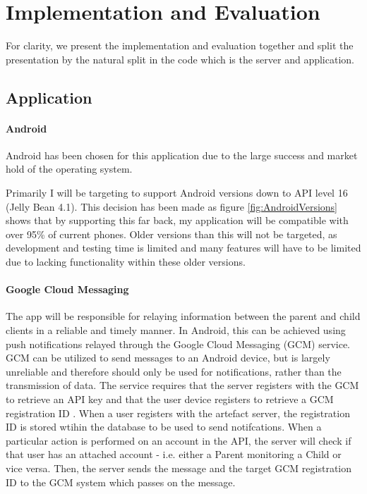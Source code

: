 \chapter{Implementation and Evaluation}

For clarity, we present the implementation and evaluation together and split the presentation by the natural split in the code which is the server and application.

\section{Application}
\subsubsection{Android}
Android has been chosen for this application due to the large success and market hold of the operating system.


Primarily I will be targeting to support Android versions down to API level 16 (Jelly Bean 4.1).
This decision has been made as figure \ref{fig:AndroidVersions} shows that by supporting this far back, my application will be compatible with over 95\% of current phones. 
Older versions than this will not be targeted, as development and testing time is limited and many features will have to be limited due to lacking functionality within these older versions.

\subsubsection{Google Cloud Messaging}
The app will be responsible for relaying information between the parent and child clients in a reliable and timely manner.
In Android, this can be achieved using push notifications relayed through the Google Cloud Messaging (GCM) service.
GCM can be utilized to send messages to an Android device, but is largely unreliable \citep{gcmreliability} and therefore should only be used for notifications, rather than the transmission of data.
The service requires that the server registers with the GCM to retrieve an API key and that the user device registers to retrieve a GCM registration ID \citep{gcm}. 
When a user registers with the artefact server, the registration ID is stored wtihin the database to be used to send notifcations.
When a particular action is performed on an account in the API, the server will check if that user has an attached account - i.e. either a Parent monitoring a Child or vice versa.
Then, the server sends the message and the target GCM registration ID to the GCM system which passes on the message.

